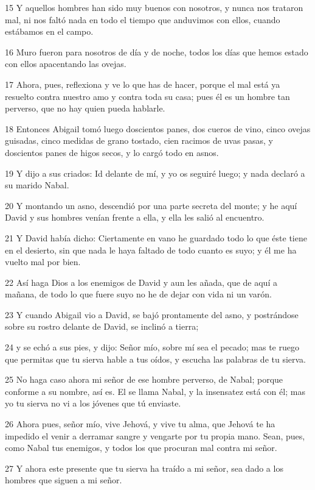 \par 15 Y aquellos hombres han sido muy buenos con nosotros, y nunca nos trataron mal, ni nos faltó nada en todo el tiempo que anduvimos con ellos, cuando estábamos en el campo.
\par 16 Muro fueron para nosotros de día y de noche, todos los días que hemos estado con ellos apacentando las ovejas.
\par 17 Ahora, pues, reflexiona y ve lo que has de hacer, porque el mal está ya resuelto contra nuestro amo y contra toda su casa; pues él es un hombre tan perverso, que no hay quien pueda hablarle.
\par 18 Entonces Abigail tomó luego doscientos panes, dos cueros de vino, cinco ovejas guisadas, cinco medidas   de grano tostado, cien racimos de uvas pasas, y doscientos panes de higos secos, y lo cargó todo en asnos.
\par 19 Y dijo a sus criados: Id delante de mí, y yo os seguiré luego; y nada declaró a su marido Nabal.
\par 20 Y montando un asno, descendió por una parte secreta del monte; y he aquí David y sus hombres venían frente a ella, y ella les salió al encuentro.
\par 21 Y David había dicho: Ciertamente en vano he guardado todo lo que éste tiene en el desierto, sin que nada le haya faltado de todo cuanto es suyo; y él me ha vuelto mal por bien.
\par 22 Así haga Dios a los enemigos de David y aun les añada, que de aquí a mañana, de todo lo que fuere suyo no he de dejar con vida ni un varón.
\par 23 Y cuando Abigail vio a David, se bajó prontamente del asno, y postrándose sobre su rostro delante de David, se inclinó a tierra;
\par 24 y se echó a sus pies, y dijo: Señor mío, sobre mí sea el pecado; mas te ruego que permitas que tu sierva hable a tus oídos, y escucha las palabras de tu sierva.
\par 25 No haga caso ahora mi señor de ese hombre perverso, de Nabal; porque conforme a su nombre, así es. El se llama Nabal, y la insensatez está con él; mas yo tu sierva no vi a los jóvenes que tú enviaste.
\par 26 Ahora pues, señor mío, vive Jehová, y vive tu alma, que Jehová te ha impedido el venir a derramar sangre y vengarte por tu propia mano. Sean, pues, como Nabal tus enemigos, y todos los que procuran mal contra mi señor.
\par 27 Y ahora este presente que tu sierva ha traído a mi señor, sea dado a los hombres que siguen a mi señor.
